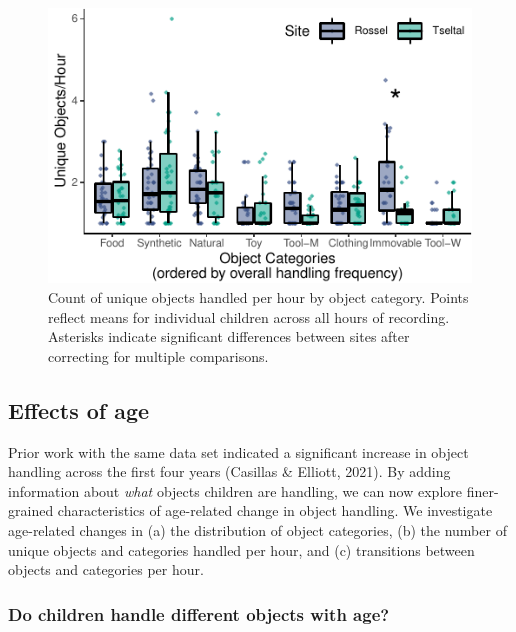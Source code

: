 \documentclass[10pt, letterpaper]{article}
\newenvironment{CodeChunk}{}{}
\begin{document}
\begin{CodeChunk}
\begin{figure}[!h]

\includegraphics{figs/overall-stats-fig-1} \hfill{}

\caption[Count of unique objects handled per hour by object category]{Count of unique objects handled per hour by object category. Points reflect means for individual children across all hours of recording. Asterisks indicate significant differences between sites after correcting for multiple comparisons.}\label{fig:overall-stats-fig}
\end{figure}
\end{CodeChunk}

\hypertarget{effects-of-age}{%
\subsection{Effects of age}\label{effects-of-age}}

Prior work with the same data set indicated a significant increase in
object handling across the first four years (Casillas \& Elliott, 2021).
By adding information about \emph{what} objects children are handling,
we can now explore finer-grained characteristics of age-related change
in object handling. We investigate age-related changes in (a) the
distribution of object categories, (b) the number of unique objects and
categories handled per hour, and (c) transitions between objects and
categories per hour.

\hypertarget{do-children-handle-different-objects-with-age}{%
\subsubsection{Do children handle different objects with
age?}\label{do-children-handle-different-objects-with-age}}
\end{document}
